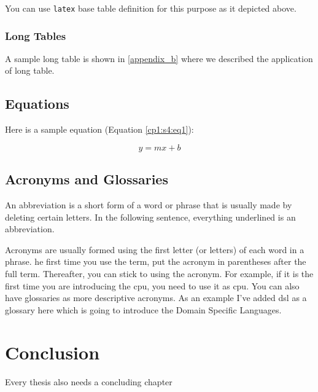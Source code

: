 \documentclass[12pt]{report}
\numberwithin{equation}{section}
\theoremstyle{definition}
\theoremstyle{remark}
\theoremstyle{example}
\theoremstyle{axiom}
\begin{document}
You can use \texttt{latex} base table definition for this purpose as it depicted above.


\subsection{Long Tables}
\label{cp1:s3:ss1}
A sample long table is shown in \ref{appendix_b}  where we described the application of
long table.


\section{Equations}
\label{cp1:s4}
Here is a sample equation (Equation \ref{cp1:s4:eq1}):

\begin{equation}
\label{cp1:s4:eq1}
	y = mx + b
\end{equation}


\setcounter{figure}{0}
\setcounter{equation}{0}
\setcounter{table}{0}
\section{Acronyms and Glossaries}
\label{cp1:s5}
An abbreviation is a short form of a word or phrase that is usually made by
deleting certain letters. In the following sentence, everything underlined is an
abbreviation.

Acronyms are usually formed using the first letter (or letters) of each word in
a phrase. he first time you use the term, put the acronym in parentheses after
the full term. Thereafter, you can stick to using the acronym. For example, if
it is the first time you are introducing the \acrshort{cpu}, you need to use it as \Acrfull{cpu}. You can also have glossaries as more descriptive
acronyms. As an example I've added \gls{dsl} as a glossary here which is going to
introduce the Domain Specific Languages.


\chapter{Conclusion}
\label{conclusion}
Every thesis also needs a concluding chapter



\setcounter{figure}{0}
\setcounter{equation}{0}
\setcounter{table}{0}
\end{document}
